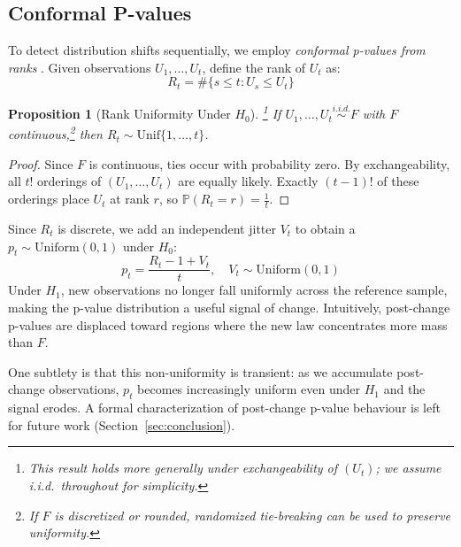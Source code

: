 \documentclass[ejsv2, noshowframe]{imsart}
\theoremstyle{plain}
\newtheorem{proposition}{Proposition}
\theoremstyle{definition}
\theoremstyle{remark}
\newcommand{\Prob}{\mathbb{P}}
\newcommand{\Unif}{\mathrm{Uniform}}
\begin{document}
\subsection{Conformal P-values}
\label{sec:pvals}

To detect distribution shifts sequentially, we employ \emph{conformal p-values from ranks} \citep{vovk2005algorithmic}. Given observations $U_1, \ldots, U_t$, define the rank of $U_t$ as:
\begin{equation}
 R_t = \#\{s \leq t : U_s \leq U_t\}
\end{equation}

\begin{proposition}[Rank Uniformity Under $H_0$]\footnote{This result holds more generally under exchangeability of $(U_t)$; we assume i.i.d.\ throughout for simplicity.}
\label{prop:rank}
If $U_1, \ldots, U_t \overset{i.i.d.}{\sim} F$ with $F$ continuous,\footnote{If $F$ is discretized or rounded, randomized tie-breaking can be used to preserve uniformity.} then $R_t \sim \mathrm{Unif}\{1, \ldots, t\}$.
\end{proposition}
\begin{proof}
Since $F$ is continuous, ties occur with probability zero. By exchangeability, all $t!$ orderings of $(U_1,\ldots,U_t)$ are equally likely. Exactly $(t-1)!$ of these orderings place $U_t$ at rank $r$, so $\Prob(R_t = r) = \tfrac{1}{t}$.
\end{proof}

\noindent Since $R_t$ is discrete, we add an independent jitter $V_t$ to obtain a $p_t \sim \Unif(0,1)$ under $H_0$:
\begin{equation}
 p_t = \frac{R_t - 1 + V_t}{t}, \quad V_t \sim \Unif(0,1)
\end{equation}
Under $H_1$, new observations no longer fall uniformly across the reference sample, making the p-value distribution a useful signal of change. Intuitively, post-change p-values are displaced toward regions where the new law concentrates more mass than $F$.

One subtlety is that this non-uniformity is transient: as we accumulate post-change observations, $p_t$ becomes increasingly uniform even under $H_1$ and the signal erodes. A formal characterization of post-change p-value behaviour is left for future work (Section~\ref{sec:conclusion}).
\end{document}

